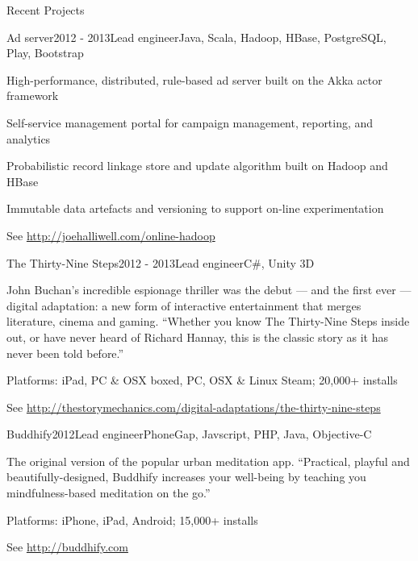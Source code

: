 \documentclass{resume} %
\begin{document}
\begin{rSection}{Recent Projects}
\begin{rSubsection}{Ad server}{2012 - 2013}{Lead engineer}{Java, Scala, Hadoop, HBase, PostgreSQL, Play, Bootstrap}
\item High-performance, distributed, rule-based ad server built on the Akka actor framework
\item Self-service management portal for campaign management, reporting, and analytics
\item Probabilistic record linkage store and update algorithm built on Hadoop and HBase
\item Immutable data artefacts and versioning to support on-line experimentation
\item See \url{http://joehalliwell.com/online-hadoop}
\end{rSubsection}

\begin{rSubsection}{The Thirty-Nine Steps}{2012 - 2013}{Lead engineer}{C\#, Unity 3D}
\item John Buchan’s incredible espionage thriller was the debut --- and the first ever --- digital adaptation: a new form of interactive entertainment that merges literature, cinema and gaming. ``Whether you know The Thirty-Nine Steps inside out, or have never heard of Richard Hannay, this is the classic story as it has never been told before.''
\item Platforms: iPad, PC \& OSX boxed, PC, OSX \& Linux Steam; 20,000+ installs
\item See \url{http://thestorymechanics.com/digital-adaptations/the-thirty-nine-steps}
\end{rSubsection}

\begin{rSubsection}{Buddhify}{2012}{Lead engineer}{PhoneGap, Javscript, PHP, Java, Objective-C}
\item The original version of the popular urban meditation app. ``Practical, playful and beautifully-designed, Buddhify increases your well-being by teaching you mindfulness-based meditation on the go.''
\item Platforms: iPhone, iPad, Android; 15,000+ installs
\item See \url{http://buddhify.com}
\end{rSubsection}



\end{rSection}
\end{document}
